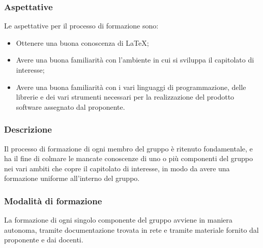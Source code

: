         \subsubsection {Aspettative}
        Le aspettative per il processo di formazione sono:
        \begin {itemize}
          \item Ottenere una buona conoscenza di \LaTeX{};
          \item Avere una buona familiarità con l'ambiente in cui si sviluppa il capitolato di interesse;
          \item Avere una buona familiarità con i vari linguaggi di programmazione, delle librerie e dei vari strumenti necessari per la realizzazione del prodotto software assegnato dal proponente.
        \end {itemize}
        \subsubsection {Descrizione}
        Il processo di formazione di ogni membro del gruppo \groupName{} è ritenuto fondamentale, e ha il fine di colmare le mancate conoscenze di uno o più componenti del gruppo nei vari ambiti che copre il capitolato di interesse, in modo da avere una formazione uniforme all'interno del gruppo.
        \subsubsection {Modalità di formazione}
        La formazione di ogni singolo componente del gruppo avviene in maniera autonoma, tramite documentazione trovata in rete e tramite materiale fornito dal proponente e dai docenti.
